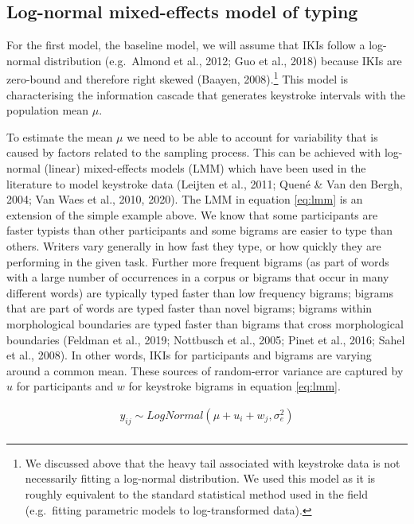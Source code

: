\documentclass[
  english,
  man,mask,floatsintext]{apa7}
\begin{document}
\hypertarget{log-normal-mixed-effects-model-of-typing}{%
\subsection{Log-normal mixed-effects model of typing}\label{log-normal-mixed-effects-model-of-typing}}

For the first model, the baseline model, we will assume that IKIs follow a log-normal distribution (e.g.~Almond et al., 2012; Guo et al., 2018) because IKIs are zero-bound and therefore right skewed (Baayen, 2008).\footnote{We discussed above that the heavy tail associated with keystroke data is not necessarily fitting a log-normal distribution. We used this model as it is roughly equivalent to the standard statistical method used in the field (e.g.~fitting parametric models to log-transformed data).} This model is characterising the information cascade that generates keystroke intervals with the population mean \(\mu\).

To estimate the mean \(\mu\) we need to be able to account for variability that is caused by factors related to the sampling process. This can be achieved with log-normal (linear) mixed-effects models (LMM) which have been used in the literature to model keystroke data (Leijten et al., 2011; Quené \& Van den Bergh, 2004; Van Waes et al., 2010, 2020). The LMM in equation \ref{eq:lmm} is an extension of the simple example above. We know that some participants are faster typists than other participants and some bigrams are easier to type than others. Writers vary generally in how fast they type, or how quickly they are performing in the given task. Further more frequent bigrams (as part of words with a large number of occurrences in a corpus or bigrams that occur in many different words) are typically typed faster than low frequency bigrams; bigrams that are part of words are typed faster than novel bigrams; bigrams within morphological boundaries are typed faster than bigrams that cross morphological boundaries (Feldman et al., 2019; Nottbusch et al., 2005; Pinet et al., 2016; Sahel et al., 2008). In other words, IKIs for participants and bigrams are varying around a common mean. These sources of random-error variance are captured by \(u\) for participants and \(w\) for keystroke bigrams in equation \ref{eq:lmm}.

\[
\tag{1}
\begin{aligned}
y_{ij} \sim LogNormal(\mu + u_i + w_j, \sigma_e^2)\\
\end{aligned}
\label{eq:lmm}
\]
\end{document}
